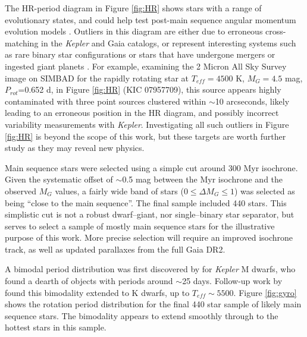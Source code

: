 \documentclass[manuscript, letterpaper]{aastex6}
\makeatletter
\let\origsection\section
\renewcommand\section{\@ifstar{\starsection}{\nostarsection}}
\newcommand\nostarsection[1]{\sectionprelude\origsection{#1}}
\newcommand\starsection[1]{\sectionprelude\origsection*{#1}}
\newcommand\sectionprelude{\vspace{1em}}
\newcommand{\Kepler}{\textsl{Kepler}\xspace}
\makeatother
\begin{document}
The HR-period diagram in Figure \ref{fig:HR} shows stars with a range of evolutionary states, and could help test post-main sequence angular momentum evolution models \citep[e.g.][]{donascimento2012}. Outliers in this diagram are either due to erroneous cross-matching in the \Kepler and Gaia catalogs, or represent interesting systems such as rare binary star configurations or stars that have undergone mergers or ingested giant planets \citep{massarotti2008,tayar2015}. For example, examining the 2 Micron All Sky Survey \citep[2MASS][]{2mass} image on SIMBAD for 
the rapidly rotating star at $T_{eff}=4500$ K, $M_G=4.5$ mag, $P_{rot}$=0.652 d, in Figure \ref{fig:HR} (KIC 07957709), this source appears highly contaminated with three point sources clustered within $\sim$10 arcseconds, likely leading to an erroneous position in the HR diagram, and possibly incorrect variability measurements with \Kepler.
Investigating all such outliers in Figure \ref{fig:HR} is beyond the scope of this work, but these targets are worth further study as they may reveal new physics.



Main sequence stars were selected using a simple cut around 300 Myr isochrone. Given the systematic offset of $\sim$0.5 mag between the Myr isochrone and the observed $M_G$ values, a fairly wide band of stars ($0\le \Delta M_G \le 1$) was selected as being ``close to the main sequence''. The final sample included 440 stars. This simplistic cut is not a robust dwarf--giant, nor single--binary star separator, but serves to select a sample of mostly main sequence stars for the illustrative purpose of this work. More precise selection will require an improved isochrone track, as well as updated parallaxes from the full Gaia DR2.








\section{Extending the Spin-Down Gap}
A bimodal period distribution was first discovered by \citet{mcquillan2013} for \Kepler M dwarfs, who found a dearth of objects with periods around $\sim$25 days. Follow-up work by \citet{mcquillan2014} found this bimodality extended to K dwarfs, up to $T_{eff}\sim5500$. Figure \ref{fig:gyro} shows the rotation period distribution for the final 440 star sample of likely main sequence stars. The bimodality appears to extend smoothly through to the hottest stars in this sample. 
\end{document}
